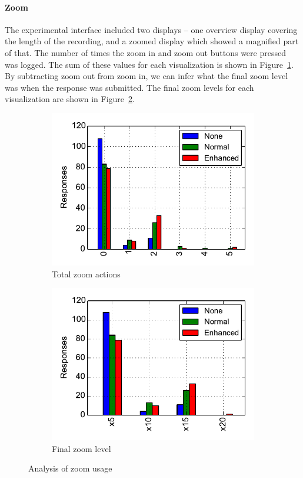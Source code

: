 \paragraph{Zoom}
The experimental interface included two displays -- one overview display covering the length of the recording, and a
zoomed display which showed a magnified part of that. The number of times the zoom in and zoom out buttons were pressed
was logged. The sum of these values for each visualization is shown in Figure~\ref{fig:zoomtotal}. By subtracting zoom
out from zoom in, we can infer what the final zoom level was when the response was submitted. The final zoom levels for
each visualization are shown in Figure~\ref{fig:zoomfinal}.

\begin{figure}[h!]
\centering
\begin{subfigure}{.5\textwidth}
  \centering
  \includegraphics[width=\linewidth]{figs/zoomtotal.pdf}
  \caption{Total zoom actions}
  \label{fig:zoomtotal}
\end{subfigure}%
\begin{subfigure}{.5\textwidth}
  \centering
  \includegraphics[width=\linewidth]{figs/zoomfinal.pdf}
  \caption{Final zoom level}
  \label{fig:zoomfinal}
\end{subfigure}
\caption{Analysis of zoom usage}
\label{fig:zoom}
\end{figure}

